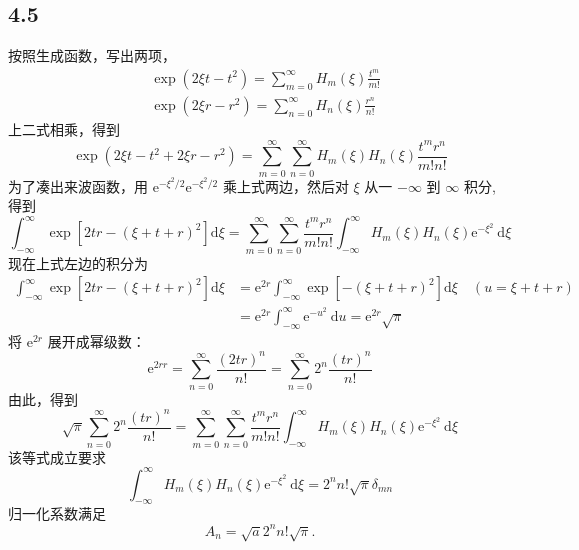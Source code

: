 \subsection{4.5}
按照生成函数，写出两项，
$$
\begin{aligned}
&\exp \left(2 \xi t-t^2\right)=\sum_{m=0}^{\infty} H_m(\xi) \frac{t^m}{m !} \\
&\exp \left(2 \xi r-r^2\right)=\sum_{n=0}^{\infty} H_n(\xi) \frac{r^n}{n !}
\end{aligned}
$$
上二式相乘，得到
$$
\exp \left(2 \xi t-t^2+2 \xi r-r^2\right)=\sum_{m=0}^{\infty} \sum_{n=0}^{\infty} H_m(\xi) H_n(\xi) \frac{t^m r^n}{m ! n !}
$$
为了凑出来波函数，用 $\mathrm{e}^{-\xi^2/2}\mathrm{e}^{-\xi^2/2}$ 乘上式两边，然后对 $\xi$ 从一 $-\infty$ 到 $\infty$ 积分, 得到
$$
\int_{-\infty}^{\infty} \exp \left[2 t r-(\xi+t+r)^2\right] \mathrm{d} \xi=\sum_{m=0}^{\infty} \sum_{n=0}^{\infty} \frac{t^m r^n}{m ! n !} \int_{-\infty}^{\infty} H_m(\xi) H_n(\xi) \mathrm{e}^{-\xi^2} \mathrm{~d} \xi
$$
现在上式左边的积分为
$$
\begin{aligned}
\int_{-\infty}^{\infty} \exp \left[2 t r-(\xi+t+r)^2\right] \mathrm{d} \xi &=\mathrm{e}^{2 r} \int_{-\infty}^{\infty} \exp \left[-(\xi+t+r)^2\right] \mathrm{d} \xi \quad(u=\xi+t+r) \\
&=\mathrm{e}^{2 r} \int_{-\infty}^{\infty} \mathrm{e}^{-u^2} \mathrm{~d} u=\mathrm{e}^{2 r} \sqrt{\pi}
\end{aligned}
$$
将 $\mathrm{e}^{2 r}$ 展开成幂级数：
$$
\mathrm{e}^{2 r r}=\sum_{n=0}^{\infty} \frac{(2 t r)^n}{n !}=\sum_{n=0}^{\infty} 2^n \frac{(t r)^n}{n !}
$$
由此，得到
$$
\sqrt{\pi} \sum_{n=0}^{\infty} 2^n \frac{(t r)^n}{n !}=\sum_{m=0}^{\infty} \sum_{n=0}^{\infty} \frac{t^m r^n}{m ! n !} \int_{-\infty}^{\infty} H_m(\xi) H_n(\xi) \mathrm{e}^{-\xi^2} \mathrm{~d} \xi
$$
该等式成立要求
$$
\int_{-\infty}^{\infty} H_m(\xi) H_n(\xi) \mathrm{e}^{-\xi^2} \mathrm{~d} \xi=2^n n ! \sqrt{\pi} \delta_{m n}
$$
归一化系数满足
$$
A_n = \sqrt{a}2^n n ! \sqrt{\pi}. 
$$

